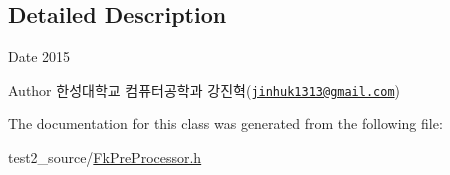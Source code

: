 \subsection{Detailed Description}
\begin{DoxyDate}{Date}
2015 
\end{DoxyDate}
\begin{DoxyAuthor}{Author}
한성대학교 컴퓨터공학과 강진혁(\href{mailto:jinhuk1313@gmail.com}{\tt jinhuk1313@gmail.\+com}) 
\end{DoxyAuthor}


The documentation for this class was generated from the following file\+:\begin{DoxyCompactItemize}
\item 
test2\+\_\+source/\hyperlink{_fk_pre_processor_8h}{Fk\+Pre\+Processor.\+h}\end{DoxyCompactItemize}
